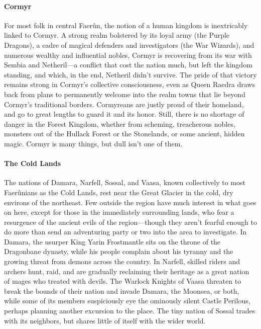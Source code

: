 \documentclass[10pt,a4paper,twoside,twocolumn,openany,bg=print,nodeprecatedcode]{dndbook}
\begin{document}
\paragraph{Cormyr}
For most folk in central Faerûn, the notion of a human kingdom is inextricably linked to Cormyr. A strong realm bolstered by its loyal army (the Purple Dragons), a cadre of magical defenders and investigators (the War Wizards), and numerous wealthy and influential nobles, Cormyr is recovering from its war with Sembia and Netheril—a conflict that cost the nation much, but left the kingdom standing, and which, in the end, Netheril didn't survive. The pride of that victory remains strong in Cormyr's collective consciousness, even as Queen Raedra draws back from plans to permanently welcome into the realm towns that lie beyond Cormyr's traditional borders.
Cormyreans are justly proud of their homeland, and go to great lengths to guard it and its honor. Still, there is no shortage of danger in the Forest Kingdom, whether from scheming, treacherous nobles, monsters out of the Hullack Forest or the Stonelands, or some ancient, hidden magic. Cormyr is many things, but dull isn't one of them.
\paragraph{The Cold Lands}
The nations of Damara, Narfell, Sossal, and Vaasa, known collectively to most Faerûnians as the Cold Lands, rest near the Great Glacier in the cold, dry environs of the northeast. Few outside the region have much interest in what goes on here, except for those in the immediately surrounding lands, who fear a resurgence of the ancient evils of the region—though they aren't fearful enough to do more than send an adventuring party or two into the area to investigate.
In Damara, the usurper King Yarin Frostmantle sits on the throne of the Dragonbane dynasty, while his people complain about his tyranny and the growing threat from demons across the country. In Narfell, skilled riders and archers hunt, raid, and are gradually reclaiming their heritage as a great nation of mages who treated with devils. The Warlock Knights of Vaasa threaten to break the bounds of their nation and invade Damara, the Moonsea, or both, while some of its members suspiciously eye the ominously silent Castle Perilous, perhaps planning another excursion to the place. The tiny nation of Sossal trades with its neighbors, but shares little of itself with the wider world.
\end{document}
